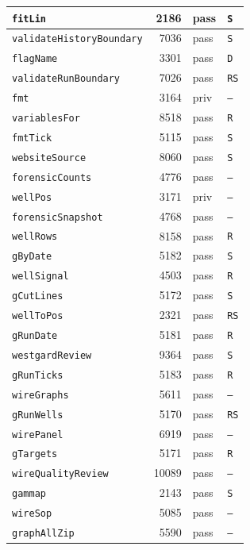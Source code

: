 {\begin{xltabular}{\linewidth}{|l|r|X|X|}
\texttt{fitLin} & 2186 & pass & \texttt{S} \\ \hline
\texttt{validateHistoryBoundary} & 7036 & pass & \texttt{S} \\ \hline
\texttt{flagName} & 3301 & pass & \texttt{D} \\ \hline
\texttt{validateRunBoundary} & 7026 & pass & \texttt{RS} \\ \hline
\texttt{fmt} & 3164 & priv & \texttt{--} \\ \hline
\texttt{variablesFor} & 8518 & pass & \texttt{R} \\ \hline
\texttt{fmtTick} & 5115 & pass & \texttt{S} \\ \hline
\texttt{websiteSource} & 8060 & pass & \texttt{S} \\ \hline
\texttt{forensicCounts} & 4776 & pass & \texttt{--} \\ \hline
\texttt{wellPos} & 3171 & priv & \texttt{--} \\ \hline
\texttt{forensicSnapshot} & 4768 & pass & \texttt{--} \\ \hline
\texttt{wellRows} & 8158 & pass & \texttt{R} \\ \hline
\texttt{gByDate} & 5182 & pass & \texttt{S} \\ \hline
\texttt{wellSignal} & 4503 & pass & \texttt{R} \\ \hline
\texttt{gCutLines} & 5172 & pass & \texttt{S} \\ \hline
\texttt{wellToPos} & 2321 & pass & \texttt{RS} \\ \hline
\texttt{gRunDate} & 5181 & pass & \texttt{R} \\ \hline
\texttt{westgardReview} & 9364 & pass & \texttt{S} \\ \hline
\texttt{gRunTicks} & 5183 & pass & \texttt{R} \\ \hline
\texttt{wireGraphs} & 5611 & pass & \texttt{--} \\ \hline
\texttt{gRunWells} & 5170 & pass & \texttt{RS} \\ \hline
\texttt{wirePanel} & 6919 & pass & \texttt{--} \\ \hline
\texttt{gTargets} & 5171 & pass & \texttt{R} \\ \hline
\texttt{wireQualityReview} & 10089 & pass & \texttt{--} \\ \hline
\texttt{gammap} & 2143 & pass & \texttt{S} \\ \hline
\texttt{wireSop} & 5085 & pass & \texttt{--} \\ \hline
\texttt{graphAllZip} & 5590 & pass & \texttt{--} \\ \hline

\end{xltabular}}
